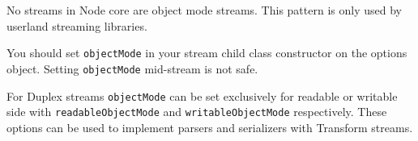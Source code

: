 No streams in Node core are object mode streams. This pattern is only
used by userland streaming libraries.

You should set \texttt{objectMode} in your stream child class
constructor on the options object. Setting \texttt{objectMode}
mid-stream is not safe.

For Duplex streams \texttt{objectMode} can be set exclusively for
readable or writable side with \texttt{readableObjectMode} and
\texttt{writableObjectMode} respectively. These options can be used to
implement parsers and serializers with Transform streams.

\begin{Shaded}
\begin{Highlighting}[]
 \NormalTok{(}\NormalTok{);}
 \NormalTok{(}\NormalTok{;}
 \NormalTok{(}\NormalTok{;}

 \NormalTok{() \{}
   \NormalTok{(!(}  
      \NormalTok{();}

  \NormalTok{(}\NormalTok{, \{ }\NormalTok{: } \NormalTok{\});}

   \NormalTok{= }\NormalTok{;}
   \NormalTok{= } \NormalTok{(}\NormalTok{);}
\NormalTok{\}}


\end{Highlighting}
\end{Shaded}
